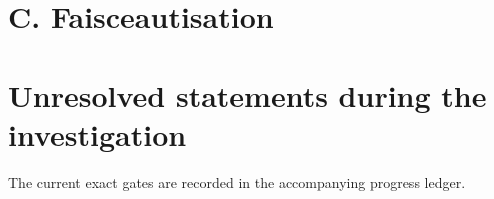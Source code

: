 \documentclass[11pt,a4paper]{article}
\theoremstyle{definition}
\begin{document}
\section{C. Faisceautisation}


























\appendix
\section{Unresolved statements during the investigation}
The current exact gates are recorded in the accompanying progress ledger.
\end{document}
